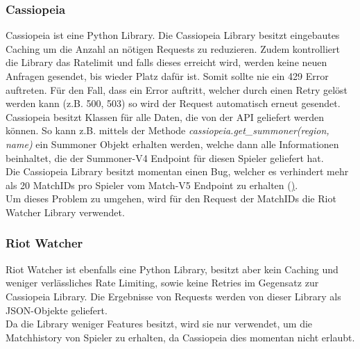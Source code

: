 \subsubsection{Cassiopeia}
Cassiopeia ist eine Python Library. Die Cassiopeia Library besitzt eingebautes Caching um die Anzahl an nötigen Requests zu reduzieren. Zudem kontrolliert die Library das Ratelimit und falls dieses erreicht wird, werden keine neuen Anfragen gesendet, bis wieder Platz dafür ist. Somit sollte nie ein 429 Error auftreten. Für den Fall, dass ein Error auftritt, welcher durch einen Retry gelöst werden kann (z.B. 500, 503) so wird der Request automatisch erneut gesendet.\\
Cassiopeia besitzt Klassen für alle Daten, die von der API geliefert werden können. So kann z.B. mittels der Methode \textit{cassiopeia.get\_summoner(region, name)} ein Summoner Objekt erhalten werden, welche dann alle Informationen beinhaltet, die der Summoner-V4 Endpoint für diesen Spieler geliefert hat.\\

Die Cassiopeia Library besitzt momentan einen Bug, welcher es verhindert mehr als 20 MatchIDs pro Spieler vom Match-V5 Endpoint zu erhalten (\href{https://github.com/meraki-analytics/cassiopeia/issues/403}).\\
Um dieses Problem zu umgehen, wird für den Request der MatchIDs die Riot Watcher Library verwendet.

\subsubsection{Riot Watcher}
Riot Watcher ist ebenfalls eine Python Library, besitzt aber kein Caching und weniger verlässliches Rate Limiting, sowie keine Retries im Gegensatz zur Cassiopeia Library.
Die Ergebnisse von Requests werden von dieser Library als JSON-Objekte geliefert.\\
Da die Library weniger Features besitzt, wird sie nur verwendet, um die Matchhistory von Spieler zu erhalten, da Cassiopeia dies momentan nicht erlaubt.